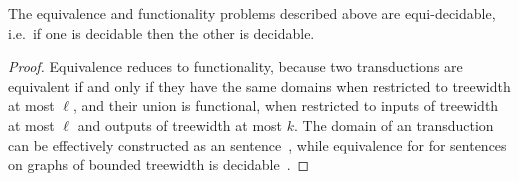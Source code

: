     


\begin{fact}\label{fact:equi-decidable}
    The equivalence and functionality problems described above are equi-decidable, i.e.~if one is decidable then the other is decidable. 
\end{fact}
\begin{proof}
    Equivalence reduces to functionality, because two transductions are  equivalent if and only if they have the same domains when restricted to treewidth at most $\ell$, and their union is  functional, when restricted to inputs of treewidth at most $\ell$ and outputs of treewidth at most $k$.  The domain of an \mso transduction can be effectively constructed as an \mso sentence~\cite[Backwards Translation Theorem]{courcelleGraphStructureMonadic2012}, while equivalence for \mso for sentences on graphs of bounded treewidth is decidable~\cite[Theorem 5.80]{courcelleGraphStructureMonadic2012}.


\end{proof}
